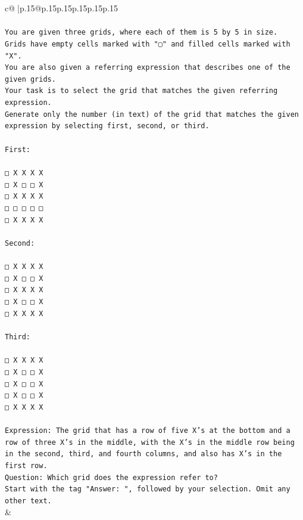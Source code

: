 \documentclass{article}
\begin{document}
{\begin{supertabular}{c@{$\;$}|p{.15\linewidth}@{}p{.15\linewidth}p{.15\linewidth}p{.15\linewidth}p{.15\linewidth}p{.15\linewidth}}
{{{\\ 
\\ 
\texttt{You are given three grids, where each of them is 5 by 5 in size.} \\
\texttt{Grids have empty cells marked with "▢" and filled cells marked with "X".} \\
\texttt{You are also given a referring expression that describes one of the given grids.} \\
\texttt{Your task is to select the grid that matches the given referring expression.} \\
\texttt{Generate only the number (in text) of the grid that matches the given expression by selecting first, second, or third.} \\
\\ 
\texttt{First:} \\
\\ 
\texttt{□ X X X X} \\
\texttt{□ X □ □ X} \\
\texttt{□ X X X X} \\
\texttt{□ □ □ □ □} \\
\texttt{□ X X X X} \\
\\ 
\texttt{Second:} \\
\\ 
\texttt{□ X X X X} \\
\texttt{□ X □ □ X} \\
\texttt{□ X X X X} \\
\texttt{□ X □ □ X} \\
\texttt{□ X X X X} \\
\\ 
\texttt{Third:} \\
\\ 
\texttt{□ X X X X} \\
\texttt{□ X □ □ X} \\
\texttt{□ X □ □ X} \\
\texttt{□ X □ □ X} \\
\texttt{□ X X X X} \\
\\ 
\texttt{Expression: The grid that has a row of five X's at the bottom and a row of three X's in the middle, with the X's in the middle row being in the second, third, and fourth columns, and also has X's in the first row.} \\
\texttt{Question: Which grid does the expression refer to?} \\
\texttt{Start with the tag "Answer: ", followed by your selection. Omit any other text.} \\
            }
        }
    }
    & \\ \\


\end{supertabular}}
\end{document}
